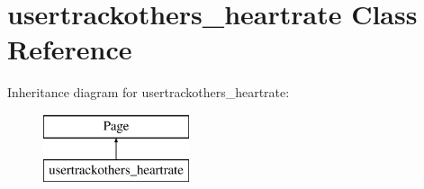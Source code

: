 \hypertarget{classusertrackothers__heartrate}{\section{usertrackothers\-\_\-heartrate Class Reference}
\label{classusertrackothers__heartrate}
}
Inheritance diagram for usertrackothers\-\_\-heartrate\-:\begin{figure}[H]
\begin{center}
\leavevmode
\includegraphics[height=2.000000cm]{classusertrackothers__heartrate}
\end{center}
\end{figure}
